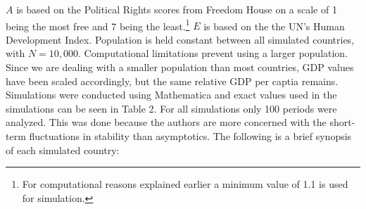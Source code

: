 \documentclass[12pt]{article}
\begin{document}
\begin{spacing}{1.5}

$A$ is based on the Political Rights scores from Freedom House on a scale of 1 being the most free and 7 being the least.\footnote{For computational reasons explained earlier a minimum value of 1.1 is used for simulation.} $E$ is based on the the UN's Human Development Index. Population is held constant between all simulated countries, with $N=10,000$. Computational limitations prevent using a larger population. Since we are dealing with a smaller population than most countries, GDP values have been scaled accordingly, but the same relative GDP per captia remains. Simulations were conducted using Mathematica and exact values used in the simulations can be seen in Table 2. For all simulations only 100 periods were analyzed. This was done because the authors are more concerned with the short-term fluctuations in stability than asymptotics. The following is a brief synopsis of each simulated country:  




\end{spacing}
\end{document}
